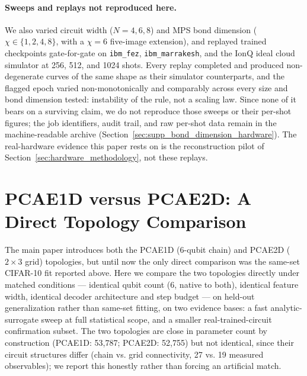 \documentclass[11pt]{article}
\begin{document}
\paragraph{Sweeps and replays not reproduced here.} We also varied circuit width ($N=4,6,8$) and MPS bond dimension ($\chi\in\{1,2,4,8\}$, with a $\chi=6$ five-image extension), and replayed trained checkpoints gate-for-gate on \texttt{ibm\_fez}, \texttt{ibm\_marrakesh}, and the IonQ ideal cloud simulator \cite{IonQBackends} at 256, 512, and 1024 shots. Every replay completed and produced non-degenerate curves of the same shape as their simulator counterparts, and the flagged epoch varied non-monotonically and comparably across every size and bond dimension tested: instability of the rule, not a scaling law. Since none of it bears on a surviving claim, we do not reproduce those sweeps or their per-shot figures; the job identifiers, audit trail, and raw per-shot data remain in the machine-readable archive (Section~\ref{sec:supp_bond_dimension_hardware}). The real-hardware evidence this paper rests on is the reconstruction pilot of Section~\ref{sec:hardware_methodology}, not these replays.
\section{PCAE1D versus PCAE2D: A Direct Topology Comparison}
\label{sec:topology_comparison}
The main paper introduces both the PCAE1D (6-qubit chain) and PCAE2D ($2\times3$ grid) topologies, but until now the only direct comparison was the same-set CIFAR-10 fit reported above. Here we compare the two topologies directly under matched conditions --- identical qubit count (6, native to both), identical feature width, identical decoder architecture and step budget --- on held-out generalization rather than same-set fitting, on two evidence bases: a fast analytic-surrogate sweep at full statistical scope, and a smaller real-trained-circuit confirmation subset. The two topologies are close in parameter count by construction (PCAE1D: 53{,}787; PCAE2D: 52{,}755) but not identical, since their circuit structures differ (chain vs. grid connectivity, 27 vs. 19 measured observables); we report this honestly rather than forcing an artificial match.
\end{document}
